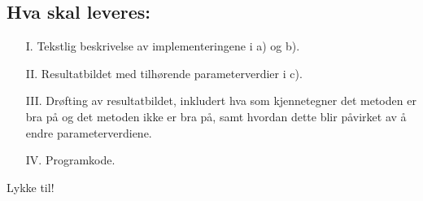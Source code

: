 \documentclass[11pt,a4paper]{article}
\begin{document}
\subsection*{Hva skal leveres:}
\begin{itemize}
\item[I.] Tekstlig beskrivelse av implementeringene i a) og b).
\item[II.] Resultatbildet med tilhørende parameterverdier i c).
\item[III.] Drøfting av resultatbildet, inkludert hva som kjennetegner det metoden er bra
på og det metoden ikke er bra på, samt hvordan dette blir påvirket av å endre
parameterverdiene.
\item[IV.] Programkode.
\end{itemize}
Lykke til!
\end{document}
